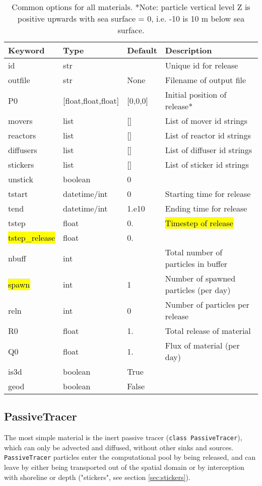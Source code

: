 \documentclass[a4paper]{article}
\begin{document}
\begin{table}[!htp]
\centering
\caption{Common options for all materials. *Note: particle vertical level Z is positive upwards with sea surface = 0, i.e. -10 is 10 m below sea surface.}
\label{tb:material}
\begin{tabular}{@{}llll@{}}
\toprule
Keyword & Type & Default & Description                         \\ 
\midrule
id          & str  &        & Unique id for release                \\
outfile     & str & None & Filename of output file \\
P0          & [float,float,float] & [0,0,0] & Initial position of release*  \\
\midrule
movers      & list & []     & List of mover id strings             \\
reactors    & list & []     & List of reactor id strings \\
diffusers   & list & []     & List of diffuser id strings \\
\midrule
stickers    & list & []     & List of sticker id strings \\
unstick     & boolean & 0     & \\
\midrule
tstart      & datetime/int & 0 & Starting time for release \\
tend        & datetime/int & 1.e10 & Ending time for release \\
tstep       & float & 0. & \hl{Timestep of release} \\
\hl{tstep\_release} & float & 0. & \\
nbuff       & int  &        & Total number of particles in buffer  \\
\hl{spawn}       & int & 1 &  Number of spawned particles (per day)  \\
reln        & int & 0 & Number of particles per release  \\
R0          & float & 1. & Total release of material  \\
Q0          & float & 1. & Flux of material (per day)  \\
\midrule
is3d        & boolean & True  & \\
geod        & boolean & False  & \\
\bottomrule
\end{tabular}
\end{table}

\FloatBarrier



\subsection{PassiveTracer}
\label{ssec:passive}

The most simple material is the inert passive tracer (\texttt{class PassiveTracer}), which can only be advected and diffused, without other sinks and sources. \texttt{PassiveTracer} particles enter the computational pool by being released, and can leave by either being transported out of the spatial domain or by interception with shoreline or depth ("stickers", see section \ref{sec:stickers}).
\end{document}
